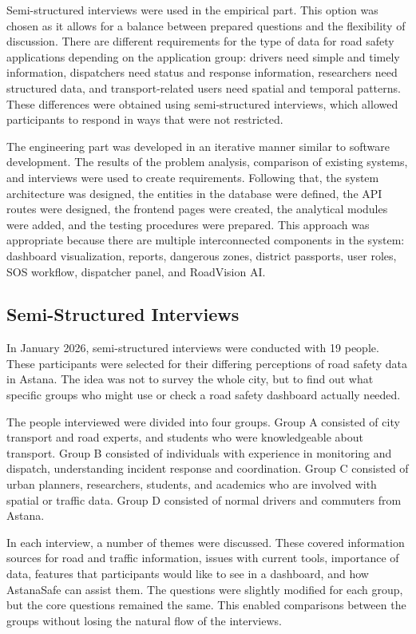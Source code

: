 ﻿\documentclass[12pt,a4paper]{report}
\begin{document}
Semi-structured interviews were used in the empirical part. This option was chosen as it allows for a balance between prepared questions and the flexibility of discussion. There are different requirements for the type of data for road safety applications depending on the application group: drivers need simple and timely information, dispatchers need status and response information, researchers need structured data, and transport-related users need spatial and temporal patterns. These differences were obtained using semi-structured interviews, which allowed participants to respond in ways that were not restricted.

The engineering part was developed in an iterative manner similar to software development. The results of the problem analysis, comparison of existing systems, and interviews were used to create requirements. Following that, the system architecture was designed, the entities in the database were defined, the API routes were designed, the frontend pages were created, the analytical modules were added, and the testing procedures were prepared. This approach was appropriate because there are multiple interconnected components in the system: dashboard visualization, reports, dangerous zones, district passports, user roles, SOS workflow, dispatcher panel, and RoadVision AI.

\subsection{Semi-Structured Interviews}

In January 2026, semi-structured interviews were conducted with 19 people. These participants were selected for their differing perceptions of road safety data in Astana. The idea was not to survey the whole city, but to find out what specific groups who might use or check a road safety dashboard actually needed.

The people interviewed were divided into four groups. Group A consisted of city transport and road experts, and students who were knowledgeable about transport. Group B consisted of individuals with experience in monitoring and dispatch, understanding incident response and coordination. Group C consisted of urban planners, researchers, students, and academics who are involved with spatial or traffic data. Group D consisted of normal drivers and commuters from Astana.

In each interview, a number of themes were discussed. These covered information sources for road and traffic information, issues with current tools, importance of data, features that participants would like to see in a dashboard, and how AstanaSafe can assist them. The questions were slightly modified for each group, but the core questions remained the same. This enabled comparisons between the groups without losing the natural flow of the interviews.
\end{document}
